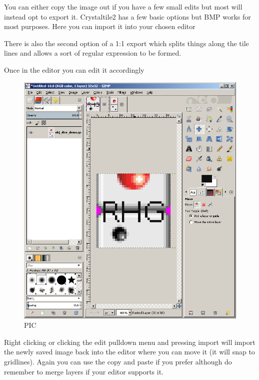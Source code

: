 \documentclass[
]{book}
\begin{document}
You can either copy the image out if you have a few small edits but most will instead opt to export it. Crystaltile2 has a few basic options but BMP works for most purposes. Here you can import it into your chosen editor

There is also the second option of a 1:1 export which splits things along the tile lines and allows a sort of regular expression to be formed.

Once in the editor you can edit it accordingly

\begin{figure}
\centering
\includegraphics{images/27_home_fast6191_romhackingguide_unrenamed_file____borders_romhackingguidecrystaltile2export2.png}
\caption{PIC}
\end{figure}

Right clicking or clicking the edit pulldown menu and pressing import will import the newly saved image back into the editor where you can move it (it will snap to gridlines). Again you can use the copy and paste if you prefer although do remember to merge layers if your editor supports it.
\end{document}
